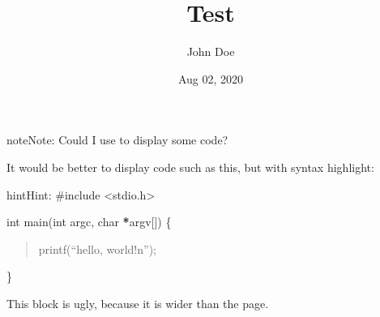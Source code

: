 \documentclass[letterpaper,10pt,english]{sphinxmanual}
\title{Test}
\date{Aug 02, 2020}
\author{John Doe}
\begin{document}
\pagestyle{empty}
\sphinxmaketitle
\pagestyle{plain}
\sphinxtableofcontents
\pagestyle{normal}
\label{\detokenize{index::doc}}



\begin{sphinxadmonition}{note}{Note:}
Could I use  to display some code?
\end{sphinxadmonition}

It would be better to display code such as this, but with syntax highlight:

\begin{sphinxadmonition}{hint}{Hint:}
\#include \textless{}stdio.h\textgreater{}

int main(int argc, char {\color{red}\bfseries{}*}argv{[}{]})
\{
\begin{quote}

printf(“hello, world!n”);
\end{quote}

\}
\end{sphinxadmonition}

This block is ugly, because it is wider than the page.

\begin{sphinxVerbatim}[commandchars=\\\{\}]
 

    \PYG{p}{[}\PYG{p}{]}
\end{sphinxVerbatim}



\renewcommand{\indexname}{Index}
\printindex
\end{document}
